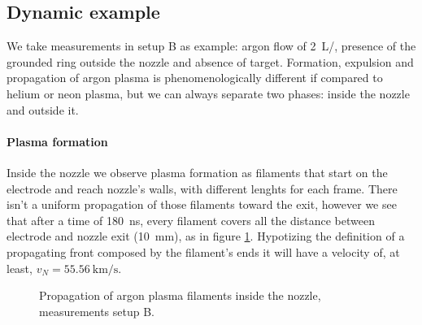 \subsection{Dynamic example}
We take measurements in setup B as example: argon flow of \SI{2}{\liter/\min}, presence of the grounded ring outside the nozzle and absence of target.
Formation, expulsion and propagation of argon plasma is phenomenologically different if compared to helium or neon plasma, but we can always separate two phases: inside the nozzle and outside it.

\paragraph{Plasma formation}
Inside the nozzle we observe plasma formation as filaments that start on the electrode and reach nozzle's walls, with different lenghts for each frame. There isn't a uniform propagation of those filaments toward the exit, however we see that after a time of \SI{180}{\nano\second}, every filament covers all the distance between electrode and nozzle exit (\SI{10}{\milli\meter}), as in figure \ref{fig:arnoz_prop}. Hypotizing the definition of a propagating front composed by the filament's ends it will have a velocity of, at least, $v_{N} = \SI{55.56}{\kilo\meter/\second}$. 
\begin{figure}
 \centering
 
 
 \caption{Propagation of argon plasma filaments inside the nozzle, measurements setup B.}
 \label{fig:arnoz_prop}
\end{figure}

